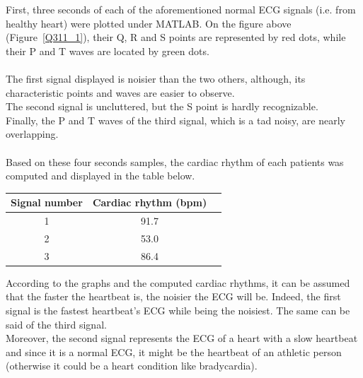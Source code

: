 \documentclass[11pt]{report}
\begin{document}
		First, three seconds of each of the aforementioned normal ECG signals (i.e. from healthy heart) were plotted under MATLAB. On the figure above (Figure~\ref{Q311_1}), their Q, R and S points are represented by red dots, while their P and T waves are located by green dots.  \\
		\\
		The first signal displayed is noisier than the two others, although, its characteristic points and waves are easier to observe.\\
		The second signal is uncluttered, but the S point is hardly recognizable.\\
		Finally, the P and T waves of the third signal, which is a tad noisy, are nearly overlapping.\\
		\\
		Based on these four seconds samples, the cardiac rhythm of each patients was computed and displayed in the table below.\\
		\begin{center}
			\begin{tabular}{|c|c|c|}
				\hline
				\textbf{Signal number} & \textbf{Cardiac rhythm (bpm)} \\
				\hline
				1 & 91.7 \\ 
				\hline
				2 & 53.0 \\
				\hline
				3 & 86.4 \\
				\hline
			\end{tabular}
		\end{center}
		According to the graphs and the computed cardiac rhythms, it can be assumed that the faster the heartbeat is, the noisier the ECG will be. Indeed, the first signal is the fastest heartbeat's ECG while being the noisiest. The same can be said of the third signal.\\
		Moreover, the second signal represents the ECG of a heart with a slow heartbeat and since it is a normal ECG, it might be the heartbeat of an athletic person (otherwise it could be a heart condition like bradycardia).\\
		\\
\end{document}
